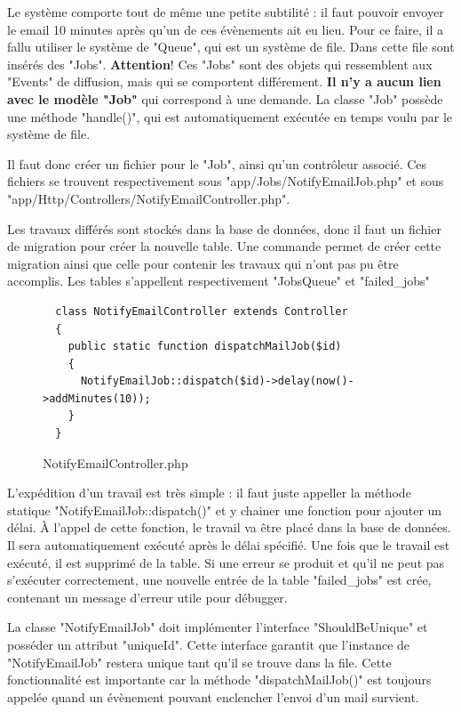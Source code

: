 \documentclass[
    iai, %
    eai, %
]{heig-tb}
\begin{document}
Le système comporte tout de même une petite subtilité : il faut pouvoir envoyer le email 10 minutes après qu'un de ces évènements ait eu lieu. Pour ce faire, il a fallu utiliser le système de "Queue", qui est un système de file. Dans cette file sont insérés des "Jobs". \textbf{Attention}! Ces "Jobs" sont des objets qui ressemblent aux "Events" de diffusion, mais qui se comportent différement. \textbf{Il n'y a aucun lien avec le modèle "Job"} qui correspond à une demande. La classe "Job" possède une méthode "handle()", qui est automatiquement exécutée en temps voulu par le système de file.

Il faut donc créer un fichier pour le "Job", ainsi qu'un contrôleur associé. Ces fichiers se trouvent respectivement sous "app/Jobs/NotifyEmailJob.php" et sous "app/Http/Controllers/NotifyEmailController.php".

Les travaux différés sont stockés dans la base de données, donc il faut un fichier de migration pour créer la nouvelle table.
Une commande permet de créer cette migration ainsi que celle pour contenir les travaux qui n'ont pas pu être accomplis. Les tables s'appellent respectivement "JobsQueue" et "failed\_jobs"

\begin{figure}[h]
  \begin{verbatim}
  class NotifyEmailController extends Controller
  {
    public static function dispatchMailJob($id)
    {
      NotifyEmailJob::dispatch($id)->delay(now()->addMinutes(10));
    }
  }
  \end{verbatim}
  \caption{NotifyEmailController.php}
\end{figure}

L'expédition d'un travail est très simple : il faut juste appeller la méthode statique "NotifyEmailJob::dispatch()" et y chainer une fonction pour ajouter un délai.
À l'appel de cette fonction, le travail va être placé dans la base de données. Il sera automatiquement exécuté après le délai spécifié. Une fois que le travail est exécuté, il est supprimé de la table. Si une erreur se produit et qu'il ne peut pas s'exécuter correctement, une nouvelle entrée de la table "failed\_jobs" est crée, contenant un message d'erreur utile pour débugger.

La classe "NotifyEmailJob" doit implémenter l'interface "ShouldBeUnique" et posséder un attribut "uniqueId". Cette interface garantit que l'instance de "NotifyEmailJob" restera unique tant qu'il se trouve dans la file. Cette fonctionnalité est importante car la méthode "dispatchMailJob()" est toujours appelée quand un évènement pouvant enclencher l'envoi d'un mail survient.
\end{document}
